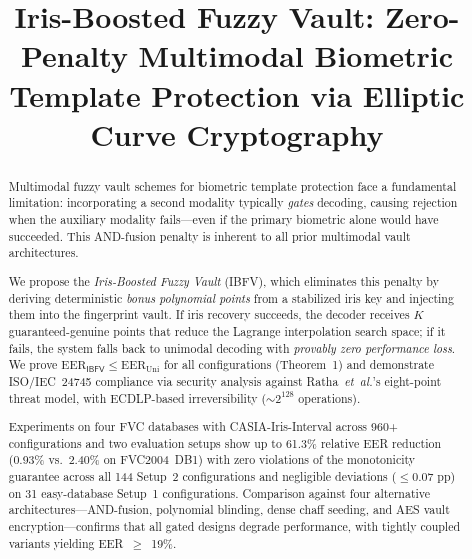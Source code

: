 \documentclass[conference]{IEEEtran}
\newcommand{\IBFV}{\textsf{IBFV}}
\newcommand{\EER}{\mathrm{EER}}
\begin{document}
\title{Iris-Boosted Fuzzy Vault: Zero-Penalty Multimodal Biometric Template Protection via Elliptic Curve Cryptography}

\author{
\and
{}
}

\maketitle

\begin{abstract}
Multimodal fuzzy vault schemes for biometric template protection face a fundamental limitation: incorporating a second modality typically \emph{gates} decoding, causing rejection when the auxiliary modality fails---even if the primary biometric alone would have succeeded. This AND-fusion penalty is inherent to all prior multimodal vault architectures.

We propose the \emph{Iris-Boosted Fuzzy Vault} (\IBFV{}), which eliminates this penalty by deriving deterministic \emph{bonus polynomial points} from a stabilized iris key and injecting them into the fingerprint vault. If iris recovery succeeds, the decoder receives $K$ guaranteed-genuine points that reduce the Lagrange interpolation search space; if it fails, the system falls back to unimodal decoding with \emph{provably zero performance loss}. We prove $\EER_{\IBFV} \leq \EER_{\text{Uni}}$ for all configurations (Theorem~1) and demonstrate ISO/IEC~24745 compliance via security analysis against Ratha~\textit{et~al.}'s eight-point threat model, with ECDLP-based irreversibility ($\sim\!2^{128}$ operations).

Experiments on four FVC databases with CASIA-Iris-Interval across 960+ configurations and two evaluation setups show up to 61.3\% relative EER reduction (0.93\% vs.\ 2.40\% on FVC2004~DB1) with zero violations of the monotonicity guarantee across all 144 Setup~2 configurations and negligible deviations ($\leq 0.07$ pp) on 31 easy-database Setup~1 configurations. Comparison against four alternative architectures---AND-fusion, polynomial blinding, dense chaff seeding, and AES vault encryption---confirms that all gated designs degrade performance, with tightly coupled variants yielding EER~$\geq$~19\%.
\end{abstract}
\end{document}
